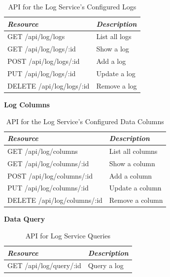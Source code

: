       \begin{table}[H]
        \centering
        \begin{tabular}{p{3in} p{3in}}
          \toprule
          \emph{Resource} & \emph{Description} \\ [0.5ex]
          \midrule
          GET /api/log/logs & List all logs \\
          GET /api/log/logs/:id & Show a log \\
          POST /api/log/logs/:id & Add a log \\
          PUT /api/log/logs/:id & Update a log \\
          DELETE /api/log/logs/:id & Remove a log \\
          \bottomrule
        \end{tabular}
        \caption{API for the Log Service's Configured Logs}\label{tab:rest-log-logs}
      \end{table}

      \large{\textbf{Log Columns}}

      \begin{table}[H]
        \centering
        \begin{tabular}{p{3in} p{3in}}
          \toprule
          \emph{Resource} & \emph{Description} \\ [0.5ex]
          \midrule
          GET /api/log/columns & List all columns \\
          GET /api/log/columns/:id & Show a column \\
          POST /api/log/columns/:id & Add a column \\
          PUT /api/log/columns/:id & Update a column \\
          DELETE /api/log/columns/:id & Remove a column \\
          \bottomrule
        \end{tabular}
        \caption{API for the Log Service's Configured Data Columns}\label{tab:rest-log-columns}
      \end{table}

      \large{\textbf{Data Query}}

      \begin{table}[H]
        \centering
        \begin{tabular}{p{3in} p{3in}}
          \toprule
          \emph{Resource} & \emph{Description} \\ [0.5ex]
          \midrule
          GET /api/log/query/:id & Query a log \\
          \bottomrule
        \end{tabular}
        \caption{API for Log Service Queries}\label{tab:rest-log-query}
      \end{table}

